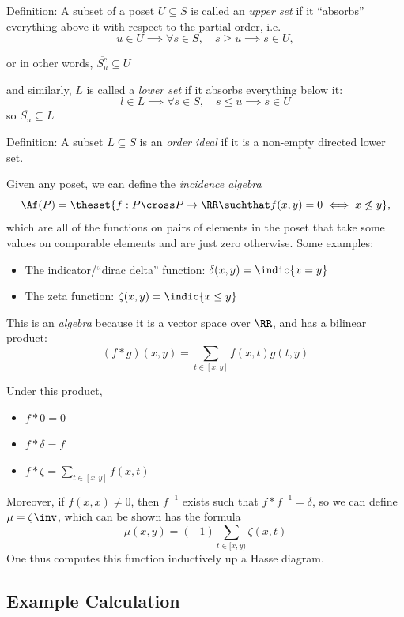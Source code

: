 Definition: A subset of a poset \(U \subseteq S\) is called an
\emph{upper set} if it ``absorbs'' everything above it with respect to
the partial order, i.e. \[
u\in U \implies \forall s\in S, \quad s \geq u \implies s \in U,
\]

or in other words, \(\overline{S_u^c} \subseteq U\)

and similarly, \(L\) is called a \emph{lower set} if it absorbs
everything below it: \[
l \in L \implies \forall s\in S, \quad s \leq u \implies s \in U
\] so \(\overline{S_u} \subseteq L\)

Definition: A subset \(L \subseteq S\) is an \emph{order ideal} if it is
a non-empty directed lower set.

Given any poset, we can define the \emph{incidence algebra} \[
\Af(P) = \theset{f: P \cross P \to \RR \suchthat f(x,y) = 0 \iff x \not\leq y },
\] which are all of the functions on pairs of elements in the poset that
take some values on comparable elements and are just zero otherwise.
Some examples:

\begin{itemize}
\tightlist
\item
  The indicator/``dirac delta'' function:
  \(\delta(x,y) = \indic{x=y}\)
\item
  The zeta function: \(\zeta(x,y) = \indic{x \leq y}\)
\end{itemize}

This is an \emph{algebra} because it is a vector space over \(\RR\), and
has a bilinear product: \[
(f \ast g)(x, y) = \sum_{t\in[x,y]}f(x,t) g(t, y)
\]

Under this product,

\begin{itemize}
\tightlist
\item
  \(f\ast 0 = 0\)
\item
  \(f\ast\delta = f\)
\item
  \(f\ast \zeta = \displaystyle\sum_{t\in[x,y]}f(x,t)\)
\end{itemize}

Moreover, if \(f(x,x) \neq 0\), then \(f^{-1}\) exists such that
\(f\ast f^{-1} = \delta\), so we can define \(\mu = \zeta\inv\), which
can be shown has the formula \[
\mu(x,y) = (-1)\sum_{ t \in [x,y)}\zeta(x, t)
\] One thus computes this function inductively up a Hasse diagram.

\hypertarget{example-calculation}{%
\subsection{Example Calculation}\label{example-calculation}}

